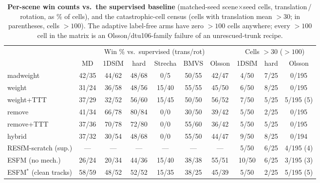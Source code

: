 \documentclass{article}
\newcommand{\mad}{madweight}
\begin{document}
\begin{table}[h]\centering\scriptsize
\setlength{\tabcolsep}{3.5pt}
\caption{\textbf{Per-scene win counts vs.\ the supervised baseline} (matched-seed
scene$\times$seed cells, translation\,/\,rotation, as \% of cells), and the
catastrophic-cell census (cells with translation mean $>30$; in parentheses, cells
$>100$). The adaptive label-free arms have zero $>100$ cells anywhere; every $>100$
cell in the matrix is an Olsson/dtu106-family failure of an unrescued-trunk recipe.}
\label{tab:wincount}
\begin{tabular}{@{}lcccccc|ccc@{}}
\toprule
 & \multicolumn{6}{c|}{Win \% vs.\ supervised (trans/rot)} & \multicolumn{3}{c}{Cells $>30$ ($>100$)}\\
 & MD & 1DSfM & hard & Strecha & BMVS & Olsson & 1DSfM & hard & Olsson\\
\midrule
\mad{}       & 42/35 & 44/62 & 48/68 & 0/5   & 50/55 & 42/47 & 4/50 & 7/25 & 0/195\\
weight       & 31/24 & 36/58 & 48/56 & 15/40 & 55/55 & 45/50 & 6/50 & 8/25 & 0/195\\
weight+TTT   & 37/29 & 32/52 & 56/60 & 15/45 & 50/50 & 56/52 & 7/50 & 5/25 & 5/195 (5)\\
remove       & 41/34 & 66/78 & 80/84 & 0/0   & 30/50 & 39/42 & 5/50 & 2/25 & 0/195\\
remove+TTT   & 37/36 & 70/78 & 72/80 & 0/0   & 55/60 & 36/42 & 5/50 & 5/25 & 0/195\\
hybrid       & 37/32 & 30/54 & 48/68 & 0/0   & 55/50 & 44/47 & 9/50 & 8/25 & 0/194\\
RESfM-scratch (sup.) & --- & --- & --- & --- & --- & --- & 5/50 & 6/25 & 4/195 (4)\\
ESFM (no mech.) & 26/24 & 20/34 & 44/36 & 15/40 & 38/38 & 55/51 & 10/50 & 6/25 & 3/195 (3)\\
ESFM$^{\ast}$ (clean tracks) & 58/59 & 48/52 & 52/52 & 15/35 & 38/25 & 45/39 & 5/50 & 2/25 & 5/195 (5)\\
\bottomrule
\end{tabular}
\end{table}
\end{document}
